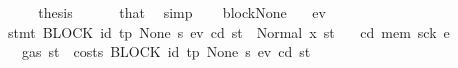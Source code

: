 \begin{isabellebody}
\ \ \ \ \isamarkupfalse%
\ \isamarkupfalse%
\ {\isacharquery}{\kern0pt}thesis\ \isamarkupfalse%
\ {}\ {}\ {}\ {}\ that{\isacharparenleft}{\kern0pt}{}{\isacharparenright}{\kern0pt}\ \isamarkupfalse%
\ simp\isanewline
\ \ \isamarkupfalse%
\isanewline
{}\isamarkupfalse%
%
\endisatagproof
{\isafoldproof}%
%
\isadelimproof
\isanewline
%
\endisadelimproof
\isanewline
{}\isamarkupfalse%
\ blockNone{\isacharcolon}{\kern0pt}\isanewline
\ \ \ ev\isanewline
\ \ \ {\isachardoublequoteopen}stmt\ {\isacharparenleft}{\kern0pt}BLOCK\ {\isacharparenleft}{\kern0pt}{\isacharparenleft}{\kern0pt}id{}{\isacharcomma}{\kern0pt}\ tp{\isacharparenright}{\kern0pt}{\isacharcomma}{\kern0pt}\ None{\isacharparenright}{\kern0pt}\ s{\isacharparenright}{\kern0pt}\ ev\ cd\ st\ {\isacharequal}{\kern0pt}\ Normal\ {\isacharparenleft}{\kern0pt}x{\isacharcomma}{\kern0pt}\ st{\isacharprime}{\kern0pt}{\isacharparenright}{\kern0pt}{\isachardoublequoteclose}\isanewline
\ \ \ cd{\isacharprime}{\kern0pt}\ mem{\isacharprime}{\kern0pt}\ sck{\isacharprime}{\kern0pt}\ e{\isacharprime}{\kern0pt}\isanewline
\ \ \ \ \ {\isachardoublequoteopen}gas\ st\ {\isachargreater}{\kern0pt}\ costs\ {\isacharparenleft}{\kern0pt}BLOCK\ {\isacharparenleft}{\kern0pt}{\isacharparenleft}{\kern0pt}id{}{\isacharcomma}{\kern0pt}\ tp{\isacharparenright}{\kern0pt}{\isacharcomma}{\kern0pt}\ None{\isacharparenright}{\kern0pt}\ s{\isacharparenright}{\kern0pt}\ ev\ cd\ st{\isachardoublequoteclose}\isanewline

\end{isabellebody}
